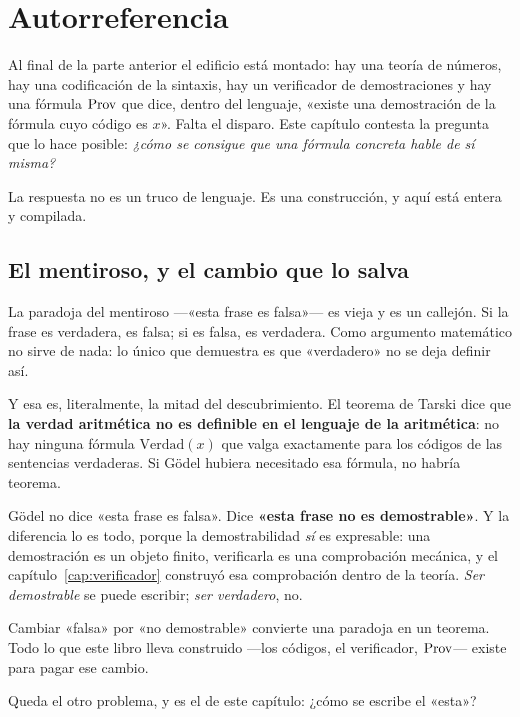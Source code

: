\chapter{Autorreferencia}
\label{cap:autorreferencia}

Al final de la parte anterior el edificio está montado: hay una teoría de números, hay una
codificación de la sintaxis, hay un verificador de demostraciones y hay una fórmula $\operatorname{Prov}$ que
dice, dentro del lenguaje, «existe una demostración de la fórmula cuyo código es $x$». Falta el
disparo. Este capítulo contesta la pregunta que lo hace posible: \emph{¿cómo se consigue que una
fórmula concreta hable de sí misma?}

La respuesta no es un truco de lenguaje. Es una construcción, y aquí está entera y compilada.

\section{El mentiroso, y el cambio que lo salva}

La paradoja del mentiroso —«esta frase es falsa»— es vieja y es un callejón. Si la frase es
verdadera, es falsa; si es falsa, es verdadera. Como argumento matemático no sirve de nada: lo
único que demuestra es que «verdadero» no se deja definir así.

Y esa es, literalmente, la mitad del descubrimiento. El teorema de Tarski dice que \textbf{la verdad
aritmética no es definible en el lenguaje de la aritmética}: no hay ninguna fórmula
$\mathrm{Verdad}(x)$ que valga exactamente para los códigos de las sentencias verdaderas. Si Gödel
hubiera necesitado esa fórmula, no habría teorema.

\begin{leccion}
Gödel no dice «esta frase es falsa». Dice \textbf{«esta frase no es demostrable»}. Y la diferencia
lo es todo, porque la demostrabilidad \emph{sí} es expresable: una demostración es un objeto
finito, verificarla es una comprobación mecánica, y el capítulo~\ref{cap:verificador} construyó esa
comprobación dentro de la teoría. \emph{Ser demostrable} se puede escribir; \emph{ser verdadero},
no.

Cambiar «falsa» por «no demostrable» convierte una paradoja en un teorema. Todo lo que este libro
lleva construido —los códigos, el verificador, $\operatorname{Prov}$— existe para pagar ese cambio.
\end{leccion}

Queda el otro problema, y es el de este capítulo: ¿cómo se escribe el «esta»?

